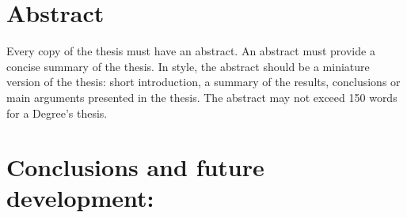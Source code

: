 \documentclass[a4paper,12pt]{article}
\begin{document}
\newpage
\listoffigures
\lstlistoflistings
\listoftables

\newpage


\clearpage
\newpage
\section*{Abstract}

{Every copy of the thesis must have an abstract. An abstract must provide a concise summary of the thesis. In style, the
abstract should be a miniature version of the thesis: short introduction, a summary of the results, conclusions or main
arguments presented in the thesis. The abstract may not exceed 150 words for a Degree’s thesis.}




%
%
%
%
%






%


\clearpage
\section{Conclusions and future development: }
\end{document}
